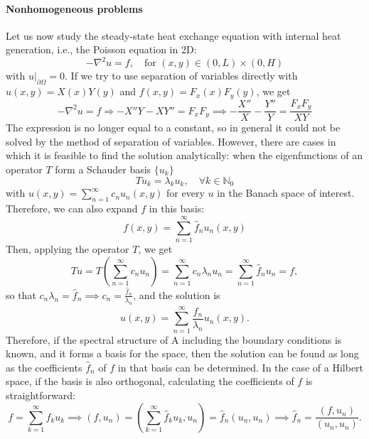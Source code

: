 \paragraph{Nonhomogeneous problems}
Let us now study the steady-state heat exchange equation with internal heat generation, i.e., the Poisson equation in 2D:
\begin{equation}\label{eq:poisson-2d}
    -\nabla^{2}u=f, \quad \text{for }(x,y)\in(0,L)\times(0,H)
\end{equation}
with $u|_{\partial\Omega}=0$. If we try to use separation of variables directly with $u(x,y)=X(x)Y(y)$ and $f(x,y)=F_{x}(x)F_{y}(y)$, we get
\begin{equation}
    -\nabla^{2}u=f\Rightarrow-X''Y-XY''=F_{x}F_{y} \implies -\frac{X''}{X}-\frac{Y''}{Y}=\frac{F_{x}F_{y}}{XY}
\end{equation}
The expression is no longer equal to a constant, so in general it could not be solved by the method of separation of variables. However, there are cases in which it is feasible to find the solution analytically: when the eigenfunctions of an operator $T$ form a Schauder basis $\{u_k\}$
\begin{equation}
    T u_{k}=\lambda_{k}u_{k}, \quad \forall k\in\mathbb{N}_0
\end{equation}
with $u(x,y)=\sum_{n=1}^{\infty}c_{n}u_{n}(x,y)$ for every $u$ in the Banach space of interest. Therefore, we can also expand $f$ in this basis:
\begin{equation}
    f(x,y)=\sum_{n=1}^{\infty}\hat{f}_{n}u_{n}(x,y)
\end{equation}
Then, applying the operator $T$, we get
\begin{equation}
    T u = T\left(\sum_{n=1}^{\infty}c_{n}u_{n}\right)=\sum_{n=1}^{\infty}c_{n}\lambda_{n}u_{n}=\sum_{n=1}^{\infty}\hat{f}_{n}u_{n}=f,
\end{equation}
so that $c_{n}\lambda_{n}=\hat{f}_{n} \implies c_{n}=\frac{\hat{f}_{n}}{\lambda_{n}}$, and the solution is
\begin{equation}
    u(x,y)=\sum_{n=1}^{\infty}\frac{\hat{f}_{n}}{\lambda_{n}}u_{n}(x,y).
\end{equation}
Therefore, if the spectral structure of A including the boundary conditions is known, and it forms a basis for the space, then the solution can be found as long as the coefficients $\hat{f}_n$ of $f$ in that basis can be determined. In the case of a Hilbert space, if the basis is also orthogonal, calculating the coefficients of $f$ is straightforward: 
\begin{equation*}
    f=\sum_{k=1}^{\infty}\hat{f}_{k}u_{k}\implies(f,u_{n})=\left(\sum_{k=1}^{\infty}\hat{f}_{k}u_{k},u_{n}\right)=\hat{f}_{n}(u_{n},u_{n}) \implies\hat{f}_{n}=\frac{(f,u_{n})}{(u_{n},u_{n})}.
\end{equation*}
